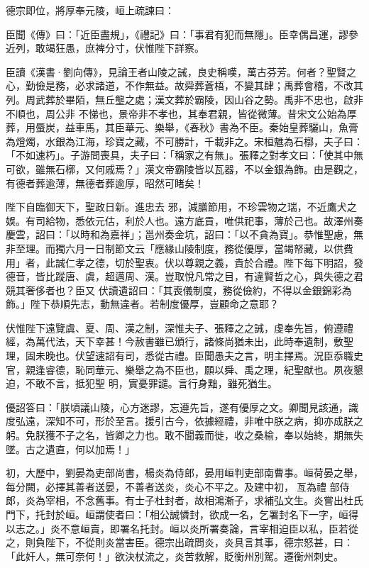\begin{pinyinscope}
 德宗即位，將厚奉元陵，峘上疏諫曰：



 臣聞《傳》曰：「近臣盡規」，《禮記》曰：「事君有犯而無隱」。臣幸偶昌運，謬參近列，敢竭狂愚，庶裨分寸，伏惟陛下詳察。



 臣讀《漢書·劉向傳》，見論王者山陵之誡，良史稱嘆，萬古芬芳。何者？聖賢之心，勤儉是務，必求諸道，不作無益。故舜葬蒼梧，不變其肆；禹葬會稽，不改其列。周武葬於畢陌，無丘壟之處；漢文葬於霸陵，因山谷之勢。禹非不忠也，啟非不順也，周公非
 不悌也，景帝非不孝也，其奉君親，皆從微薄。昔宋文公始為厚葬，用蜃炭，益車馬，其臣華元、樂舉，《春秋》書為不臣。秦始皇葬驪山，魚膏為燈燭，水銀為江海，珍寶之藏，不可勝計，千載非之。宋桓魋為石槨，夫子曰：「不如速朽」。子游問喪具，夫子曰：「稱家之有無」。張釋之對孝文曰：「使其中無可欲，雖無石槨，又何戚焉？」漢文帝霸陵皆以瓦器，不以金銀為飾。由是觀之，有德者葬逾薄，無德者葬逾厚，昭然可睹矣！



 陛下自臨御天下，聖政日新。進忠去
 邪，減膳節用，不珍雲物之瑞，不近鷹犬之娛。有司給物，悉依元估，利於人也。遠方底貢，唯供祀事，薄於己也。故澤州奏慶雲，詔曰：「以時和為嘉祥」；邕州奏金坑，詔曰：「以不貪為寶」。恭惟聖慮，無非至理。而獨六月一日制節文云「應緣山陵制度，務從優厚，當竭帑藏，以供費用」者，此誠仁孝之德，切於聖衷。伏以尊親之義，貴於合禮。陛下每下明詔，發德音，皆比蹤唐、虞，超邁周、漢。豈取悅凡常之目，有違賢哲之心，與失德之君競其奢侈者也？臣又
 伏讀遺詔曰：「其喪儀制度，務從儉約，不得以金銀錦彩為飾。」陛下恭順先志，動無違者。若制度優厚，豈顧命之意耶？



 伏惟陛下遠覽虞、夏、周、漢之制，深惟夫子、張釋之之誡，虔奉先旨，俯遵禮經，為萬代法，天下幸甚！今赦書雖已頒行，諸條尚猶未出，此時奉遺制，敷聖理，固未晚也。伏望速詔有司，悉從古禮。臣聞愚夫之言，明主擇焉。況臣忝職史官，親逢睿德，恥同華元、樂舉之為不臣也，願以舜、禹之理，紀聖猷也。夙夜懇迫，不敢不言，抵犯聖
 明，實憂罪譴。言行身黜，雖死猶生。



 優詔答曰：「朕頃議山陵，心方迷謬，忘遵先旨，遂有優厚之文。卿聞見該通，識度弘遠，深知不可，形於至言。援引古今，依據經禮，非唯中朕之病，抑亦成朕之躬。免朕獲不子之名，皆卿之力也。敢不聞義而徙，收之桑榆，奉以始終，期無失墜。古之遺直，何以加焉！」



 初，大歷中，劉晏為吏部尚書，楊炎為侍郎，晏用峘判吏部南曹事。峘荷晏之舉，每分闕，必擇其善者送晏，不善者送炎，炎心不平之。及建中初，亙為禮
 部侍郎，炎為宰相，不念舊事。有士子杜封者，故相鴻漸子，求補弘文生。炎嘗出杜氏門下，托封於峘。峘謂使者曰：「相公誠憐封，欲成一名，乞署封名下一字，峘得以志之。」炎不意峘賣，即署名托封。峘以炎所署奏論，言宰相迫臣以私，臣若從之，則負陛下，不從則炎當害臣。德宗出疏問炎，炎具言其事，德宗怒甚，曰：「此奸人，無可奈何！」欲決杖流之，炎苦救解，貶衡州別駕。遷衡州刺史。




\end{pinyinscope}
